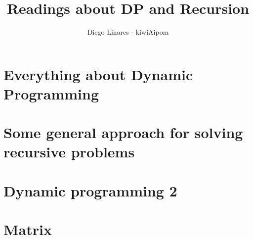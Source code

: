 \documentclass{IEEEtran}
\title{Readings about DP and Recursion}
\author{Diego Linares - kiwiAipom}
\begin{document}
    \maketitle

    \section{Everything about Dynamic Programming}

    \section{Some general approach for solving recursive problems}

    \section{Dynamic programming 2}

    \section{Matrix}
\end{document}
